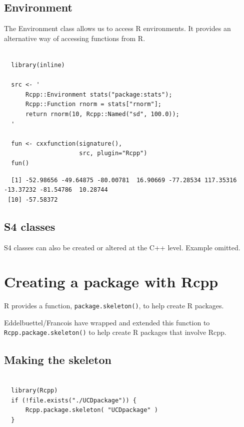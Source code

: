 \documentclass[11pt]{article}
\begin{document}
\subsection{Environment}
\label{sec-7-4}


The Environment class allows us to access R environments.  It provides
an alternative way of accessing functions from R.


\begin{verbatim}
  
  library(inline)
  
  src <- '
      Rcpp::Environment stats("package:stats");
      Rcpp::Function rnorm = stats["rnorm"];
      return rnorm(10, Rcpp::Named("sd", 100.0));
  '
  
  fun <- cxxfunction(signature(),
                     src, plugin="Rcpp")
  fun()
\end{verbatim}

\begin{verbatim}
  [1] -52.98656 -49.64875 -80.00781  16.90669 -77.28534 117.35316 -13.37232 -81.54786  10.28744
 [10] -57.58372
\end{verbatim}
\subsection{S4 classes}
\label{sec-7-5}


S4 classes can also be created or altered at the C++ level.  Example
omitted.
\section{Creating a package with Rcpp}
\label{sec-8}


R provides a function, \texttt{package.skeleton()}, to help create R
packages.

Eddelbuettel/Francois have wrapped and extended this function to
\texttt{Rcpp.package.skeleton()} to help create R packages that involve Rcpp.
\subsection{Making the skeleton}
\label{sec-8-1}



\begin{verbatim}
  
  library(Rcpp)
  if (!file.exists("./UCDpackage")) {
      Rcpp.package.skeleton( "UCDpackage" )
  }
\end{verbatim}
\end{document}
